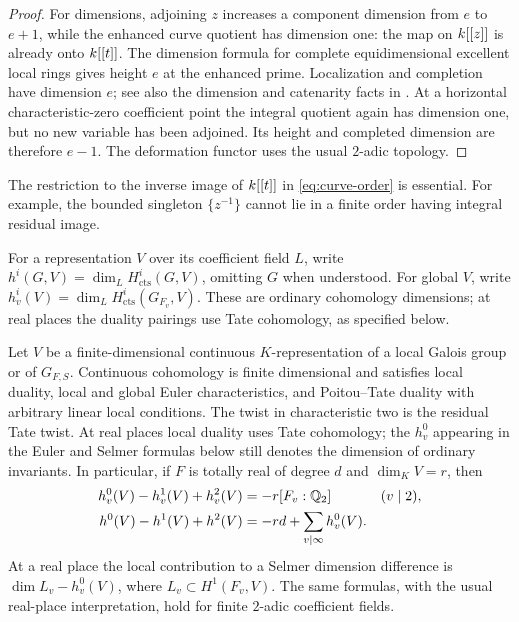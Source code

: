 \begin{proof}
For dimensions, adjoining $z$ increases a component dimension from
$e$ to $e+1$, while the enhanced curve quotient has dimension one:
the map on $k[[z]]$ is already onto $k[[t]]$.  The dimension
formula for complete equidimensional excellent local rings gives
height $e$ at the enhanced prime.  Localization and completion have
dimension $e$; see also the dimension and catenarity facts in
\cite[Tags~00KW, 032C, 0ECF and~07NV]{StacksProject}.
At a horizontal characteristic-zero coefficient point the integral
quotient again has dimension one, but no new variable has been
adjoined.  Its height and completed dimension are therefore $e-1$.
The deformation functor uses the usual $2$-adic topology.
\end{proof}

The restriction to the inverse image of $k[[t]]$ in
\eqref{eq:curve-order} is essential.  For example, the bounded
singleton $\{z^{-1}\}$ cannot lie in a finite order having integral
residual image.

For a representation $V$ over its coefficient field $L$, write
$h^i(G,V)=\dim_L H^i_{\mathrm{cts}}(G,V)$, omitting $G$ when
understood. For global $V$, write
$h^i_v(V)=\dim_L H^i_{\mathrm{cts}}(G_{F_v},V)$.
These are ordinary cohomology dimensions; at real places the
duality pairings use Tate cohomology, as specified below.

\begin{lemma}\label{lem:curve-cohomology}
Let $V$ be a finite-dimensional continuous $K$-representation of a
local Galois group or of $G_{F,S}$.  Continuous cohomology is finite
dimensional and satisfies local duality, local and global Euler
characteristics, and Poitou--Tate duality with arbitrary linear local
conditions.  The twist in characteristic two is the residual Tate
twist.  At real places local duality uses Tate cohomology; the
$h^0_v$ appearing in the Euler and Selmer formulas below still
denotes the dimension of ordinary invariants.  In particular, if
$F$ is totally real of degree $d$ and
$\dim_KV=r$, then
\begin{align}
h^0_v(V)-h^1_v(V)+h^2_v(V)&=-r[F_v:\mathbb Q_2]
                       &&(v\mid2),\\
h^0(V)-h^1(V)+h^2(V)&=-rd+\sum_{v\mid\infty}h^0_v(V).
\label{eq:global-euler-curve}
\end{align}
At a real place the local contribution to a Selmer dimension
difference is $\dim L_v-h^0_v(V)$, where
$L_v\subset H^1(F_v,V)$.  The same formulas, with the usual real-place
interpretation, hold for finite $2$-adic coefficient fields.
\end{lemma}

